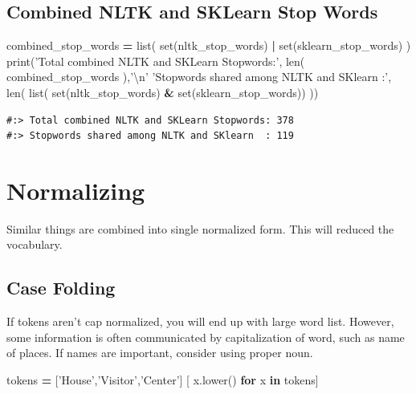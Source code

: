 \documentclass[
]{book}
\newenvironment{Shaded}{\begin{snugshade}}{\end{snugshade}}
\newcommand{\BuiltInTok}[1]{#1}
\newcommand{\CharTok}[1]{\textcolor[rgb]{0.5,0.5,0.5}{#1}}
\newcommand{\ControlFlowTok}[1]{\textcolor[rgb]{0.27,0.27,0.27}{\textbf{#1}}}
\newcommand{\KeywordTok}[1]{\textcolor[rgb]{0.27,0.27,0.27}{\textbf{#1}}}
\newcommand{\NormalTok}[1]{#1}
\newcommand{\OperatorTok}[1]{\textcolor[rgb]{0.43,0.43,0.43}{\textbf{#1}}}
\newcommand{\StringTok}[1]{\textcolor[rgb]{0.5,0.5,0.5}{#1}}
\begin{document}
\hypertarget{combined-nltk-and-sklearn-stop-words}{%
\subsection{Combined NLTK and SKLearn Stop Words}\label{combined-nltk-and-sklearn-stop-words}}

\begin{Shaded}
\begin{Highlighting}[]
\NormalTok{combined_stop_words }\OperatorTok{=} \BuiltInTok{list}\NormalTok{( }\BuiltInTok{set}\NormalTok{(nltk_stop_words) }\OperatorTok{|} \BuiltInTok{set}\NormalTok{(sklearn_stop_words) )}
\BuiltInTok{print}\NormalTok{(}\StringTok{'Total combined NLTK and SKLearn Stopwords:'}\NormalTok{, }\BuiltInTok{len}\NormalTok{( combined_stop_words ),}\StringTok{'}\CharTok{\textbackslash{}n}\StringTok{'}
      \StringTok{'Stopwords shared among NLTK and SKlearn  :'}\NormalTok{, }\BuiltInTok{len}\NormalTok{( }\BuiltInTok{list}\NormalTok{( }\BuiltInTok{set}\NormalTok{(nltk_stop_words) }\OperatorTok{&} \BuiltInTok{set}\NormalTok{(sklearn_stop_words)) ))}
\end{Highlighting}
\end{Shaded}

\begin{verbatim}
#:> Total combined NLTK and SKLearn Stopwords: 378 
#:> Stopwords shared among NLTK and SKlearn  : 119
\end{verbatim}

\hypertarget{normalizing}{%
\section{Normalizing}\label{normalizing}}

Similar things are combined into single normalized form. This will reduced the vocabulary.

\hypertarget{case-folding}{%
\subsection{Case Folding}\label{case-folding}}

If tokens aren't cap normalized, you will end up with large word list. However, some information is often communicated by capitalization of word, such as name of places. If names are important, consider using proper noun.

\begin{Shaded}
\begin{Highlighting}[]
\NormalTok{tokens }\OperatorTok{=}\NormalTok{ [}\StringTok{'House'}\NormalTok{,}\StringTok{'Visitor'}\NormalTok{,}\StringTok{'Center'}\NormalTok{]}
\NormalTok{[ x.lower() }\ControlFlowTok{for}\NormalTok{ x }\KeywordTok{in}\NormalTok{ tokens]}
\end{Highlighting}
\end{Shaded}
\end{document}

